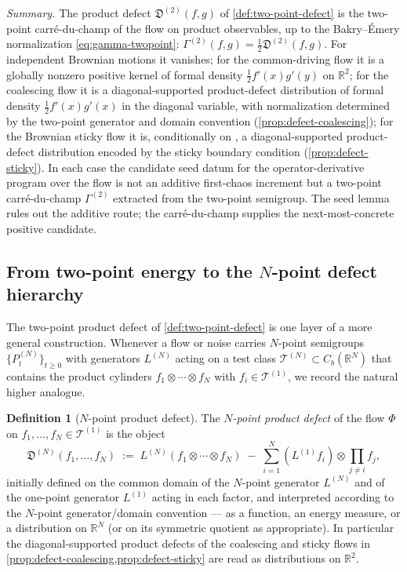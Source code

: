 \documentclass[11pt,reqno]{amsart}
\theoremstyle{plain}
\theoremstyle{definition}
\newtheorem{definition}[theorem]{Definition}
\theoremstyle{remark}
\newcommand{\R}{\mathbb{R}}
\begin{document}
\medskip
\noindent\emph{Summary.} The product defect $\mathfrak D^{(2)}(f,g)$
of \cref{def:two-point-defect} is the two-point carr\'e-du-champ of
the flow on product observables, up to the Bakry--\'Emery
normalization \eqref{eq:gamma-twopoint}:
$\Gamma^{(2)}(f,g)=\tfrac{1}{2}\mathfrak D^{(2)}(f,g)$. For
independent Brownian motions it vanishes; for the common-driving
flow it is a globally nonzero positive kernel of formal density
$\tfrac{1}{2}f'(x)g'(y)$ on $\R^{2}$; for the coalescing flow it is
a diagonal-supported product-defect distribution of formal density
$\tfrac{1}{2}f'(x)g'(x)$ in the diagonal variable, with
normalization determined by the two-point generator and domain
convention (\cref{prop:defect-coalescing}); for the Brownian sticky
flow it is, conditionally on \cite{LeJanRaimond2004}, a
diagonal-supported product-defect distribution encoded by the
sticky boundary condition (\cref{prop:defect-sticky}). In each case
the candidate seed datum for the operator-derivative program over
the flow is not an additive first-chaos increment but a two-point
carr\'e-du-champ $\Gamma^{(2)}$ extracted from the two-point
semigroup. The seed lemma rules out the additive route; the
carr\'e-du-champ supplies the next-most-concrete positive candidate.

\subsection{\texorpdfstring{From two-point energy to the \(N\)-point defect hierarchy}{From two-point energy to the N-point defect hierarchy}}\label{sec:twopoint-hierarchy}

The two-point product defect of \cref{def:two-point-defect} is one
layer of a more general construction. Whenever a flow or noise
carries $N$-point semigroups $\{P_t^{(N)}\}_{t\ge 0}$ with generators
$L^{(N)}$ acting on a test class
$\mathcal T^{(N)}\subset C_b(\R^N)$ that contains the product
cylinders $f_1\otimes\cdots\otimes f_N$ with
$f_i\in\mathcal T^{(1)}$, we record the natural higher analogue.

\begin{definition}[\texorpdfstring{\(N\)-point product defect}{N-point product defect}]\label{def:N-point-defect}
The \emph{$N$-point product defect} of the flow $\Phi$ on
$f_1,\ldots,f_N\in\mathcal T^{(1)}$ is the object
\begin{equation}\label{eq:N-point-defect}
  \mathfrak D^{(N)}(f_1,\ldots,f_N)
  \;:=\;
  L^{(N)}(f_1\otimes\cdots\otimes f_N)
  \;-\;\sum_{i=1}^{N}(L^{(1)}f_i)\otimes\prod_{j\neq i}f_j,
\end{equation}
initially defined on the common domain of the $N$-point generator
$L^{(N)}$ and of the one-point generator $L^{(1)}$ acting in each
factor, and interpreted according to the $N$-point generator/domain
convention --- as a function, an energy measure, or a distribution
on $\R^{N}$ (or on its symmetric quotient as appropriate). In
particular the diagonal-supported product defects of the coalescing
and sticky flows in
\cref{prop:defect-coalescing,prop:defect-sticky} are read as
distributions on $\R^{2}$.
\end{definition}
\end{document}
